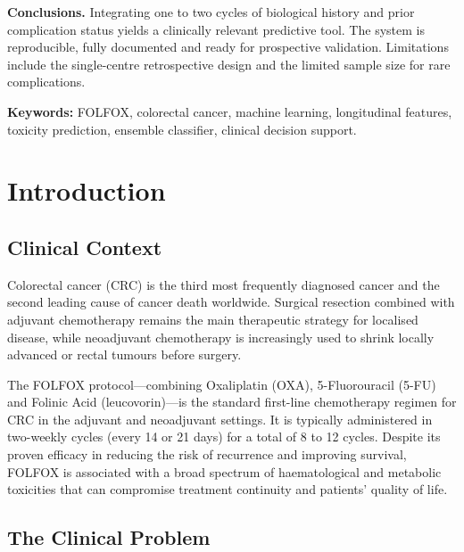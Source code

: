 \documentclass[12pt,a4paper]{report}
\begin{document}
\vspace{0.5em}
\noindent\textbf{Conclusions.}
Integrating one to two cycles of biological history and prior complication status yields a clinically relevant predictive tool. The system is reproducible, fully documented and ready for prospective validation. Limitations include the single-centre retrospective design and the limited sample size for rare complications.

\vspace{1em}
\noindent\textbf{Keywords:} FOLFOX, colorectal cancer, machine learning, longitudinal features, toxicity prediction, ensemble classifier, clinical decision support.

\tableofcontents
\listoffigures
\listoftables

\chapter{Introduction}

\section{Clinical Context}

Colorectal cancer (CRC) is the third most frequently diagnosed cancer and the second leading cause of cancer death worldwide. Surgical resection combined with adjuvant chemotherapy remains the main therapeutic strategy for localised disease, while neoadjuvant chemotherapy is increasingly used to shrink locally advanced or rectal tumours before surgery.

The FOLFOX protocol---combining Oxaliplatin (OXA), 5-Fluorouracil (5-FU) and Folinic Acid (leucovorin)---is the standard first-line chemotherapy regimen for CRC in the adjuvant and neoadjuvant settings. It is typically administered in two-weekly cycles (every 14 or 21 days) for a total of 8 to 12 cycles. Despite its proven efficacy in reducing the risk of recurrence and improving survival, FOLFOX is associated with a broad spectrum of haematological and metabolic toxicities that can compromise treatment continuity and patients' quality of life.

\section{The Clinical Problem}
\end{document}
